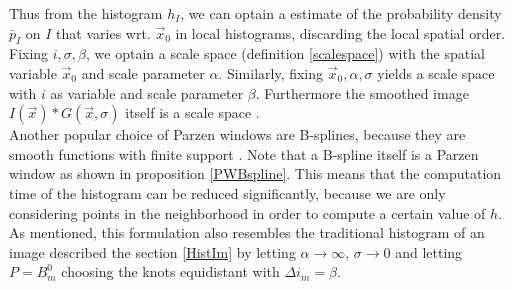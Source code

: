 Thus from the histogram $h_I$, we can optain a estimate of the probability density $\bar{p}_I$ on $I$ that varies wrt. $\vec{x}_0$ in local histograms, discarding the local spatial order. Fixing $i,\sigma,\beta$, we optain a scale space (definition \ref{scalespace}) with the spatial variable $\vec{x}_0$ and scale parameter $\alpha$. Similarly, fixing $\vec{x}_0,\alpha,\sigma$ yields a scale space with $i$ as variable and scale parameter $\beta$. Furthermore the smoothed image $I(\vec{x})*G(\vec{x},\sigma)$ itself is a scale space \cite{dar.12}.\\

 Another popular choice of Parzen windows are B-splines, because they are smooth functions with finite support \cite{the.00}. Note that a B-spline itself is a Parzen window as shown in proposition \ref{PWBspline}. This means that the computation time of the histogram can be reduced significantly, because we are only considering points in the neighborhood in order to compute a certain value of $h$.\\
As mentioned, this formulation also resembles the traditional histogram of an image described the section \ref{HistIm} by letting $\alpha\to\infty$, $\sigma\to 0$ and letting $P=B_m^0$ choosing the knots equidistant with $\Delta i_m = \beta$.